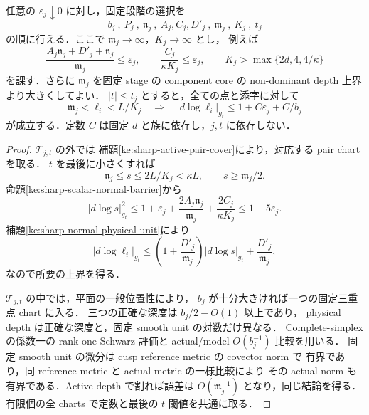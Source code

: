 \begin{theorem}
\label{ke:sharp-global-one-active}
任意の $\varepsilon_j\downarrow0$ に対し，固定段階の選択を
\[
 b_j\ ,\ P_j\ ,\ \mathfrak n_j\ ,\ A_j,C_j,D'_j\ ,\
 \mathfrak m_j\ ,\ K_j\ ,\ t_j
\]
の順に行える．ここで $\mathfrak m_j\to\infty$，$K_j\to\infty$ とし，
例えば
\begin{equation}\label{ke:eq:sharp-normal-parameter-order}
 \frac{A_j\mathfrak n_j+D'_j+\mathfrak n_j}{\mathfrak m_j}\le\varepsilon_j,
 \qquad \frac{C_j}{\kappa K_j}\le\varepsilon_j,
 \qquad K_j>\max\{2d,4,4/\kappa\}
\end{equation}
を課す．さらに $\mathfrak m_j$ を固定 stage の component core の
non-dominant depth 上界より大きくしてよい．
$|t|\le t_j$ とすると，全ての点と添字に対して
\begin{equation}\label{ke:eq:sharp-global-one-active}
 \mathfrak m_j<\ell_i<L/K_j
 \quad\Longrightarrow\quad
 |d\log\ell_i|_{g_t}\le1+C\varepsilon_j+C/b_j
\end{equation}
が成立する．定数 $C$ は固定 $d$ と族に依存し，$j,t$ に依存しない．
\end{theorem}

\begin{proof}
$\mathcal T_{j,t}$ の外では
補題\ref{ke:sharp-active-pair-cover}により，対応する pair chart を取る．
$t$ を最後に小さくすれば
\[
 \mathfrak n_j\le s\le2L/K_j<\kappa L,
 \qquad s\ge\mathfrak m_j/2.
\]
命題\ref{ke:sharp-scalar-normal-barrier}から
\[
 |d\log s|_{g_t}^2
 \le1+\varepsilon_j+\frac{2A_j\mathfrak n_j}{\mathfrak m_j}
                    +\frac{2C_j}{\kappa K_j}
 \le1+5\varepsilon_j.
\]
補題\ref{ke:sharp-normal-physical-unit}により
\[
 |d\log\ell_i|_{g_t}
 \le\left(1+\frac{D'_j}{\mathfrak m_j}\right)|d\log s|_{g_t}
       +\frac{D'_j}{\mathfrak m_j},
\]
なので所要の上界を得る．

$\mathcal T_{j,t}$ の中では，平面の一般位置性により，
$b_j$ が十分大きければ一つの固定三重点 chart に入る．
三つの正確な深度は $b_j/2-O(1)$ 以上であり，
physical depth は正確な深度と，固定 smooth unit の対数だけ異なる．
Complete-simplex の係数一の rank-one Schwarz 評価と
actual/model $O(b_j^{-1})$ 比較を用いる．
固定 smooth unit の微分は cusp reference metric の covector norm で
有界であり，同 reference metric と actual metric の一様比較により
その actual norm も有界である．Active depth で割れば誤差は
$O(\mathfrak m_j^{-1})$ となり，同じ結論を得る．
有限個の全 charts で定数と最後の $t$ 閾値を共通に取る．
\end{proof}

